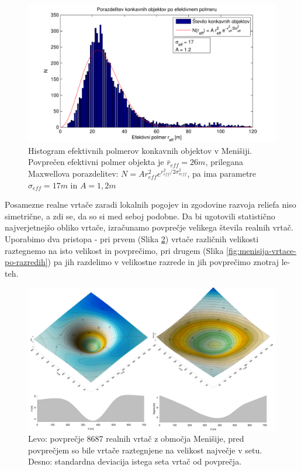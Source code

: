\documentclass[a4paper, twoside, 12pt]{book}
\begin{document}
  \begin{figure}[h!]
    \begin{center}
      \includegraphics[width=12cm]{slike/menisija-polmeri-hist-maxwell}
    \end{center}
    \caption{Histogram efektivnih polmerov konkavnih objektov v Menišiji. Povprečen efektivni polmer objekta je $\bar r_{eff}=26m$, prilegana Maxwellova porazdelitev: $ N = A r_{eff}^2 e^{r_{eff}^2/2 \sigma_{reff}^2}$, pa ima parametre $\sigma_{eff}=17m$ in $A=1,2m$}
    \label{fig:menisija-polmeri-hist}
  \end{figure}

  Posamezne realne vrtače zaradi lokalnih pogojev in zgodovine razvoja reliefa niso simetrične, a zdi se, da so si med seboj podobne. Da bi ugotovili statistično najverjetnejšo obliko vrtače, izračunamo povprečje velikega števila realnih vrtač. Uporabimo dva pristopa - pri prvem (Slika \ref{fig:menisija-vrtaca}) vrtače različnih velikosti raztegnemo na isto velikost in povprečimo, pri drugem (Slika \ref{fig:menisija-vrtace-po-razredih}) pa jih razdelimo v velikostne razrede in jih povprečimo znotraj le-teh.

  \begin{figure}[h!]
    \begin{center}
      \includegraphics[width=14cm]{slike/menisija-vrtaca-sigma}
    \end{center}
    \caption{Levo: povprečje 8687 realnih vrtač z območja Menišije, pred povprečjem so bile vrtače raztegnjene na velikost največje v setu. Desno: standardna deviacija istega seta vrtač od povprečja.}
    \label{fig:menisija-vrtaca}
  \end{figure}
\end{document}
